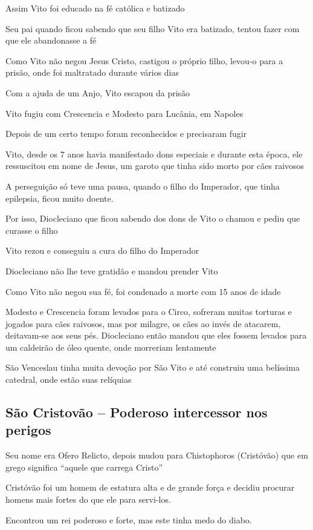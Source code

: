 \documentclass[a4paper,12pt]{extarticle} \usepackage[utf8]{inputenc}
\begin{document}
Assim Vito foi educado na fé católica e batizado

Seu pai quando ficou sabendo que seu filho Vito era batizado, tentou fazer com que ele abandonasse a fé

Como Vito não negou Jesus Cristo, castigou o próprio filho, levou-o para a prisão, onde foi maltratado durante vários dias

Com a ajuda de um Anjo, Vito escapou da prisão

Vito fugiu com Crescencia e Modesto para Lucânia, em Napoles

Depois de um certo tempo foram reconhecidos e precisaram fugir

Vito, desde os 7 anos havia manifestado dons especiais e durante esta época, ele ressuscitou em nome de Jesus, um garoto que tinha sido morto por cães raivosos

A perseguição só teve uma pausa, quando o filho do Imperador, que tinha epilepsia, ficou muito doente.

Por isso, Diocleciano que ficou sabendo dos dons de Vito o chamou e pediu que curasse o filho

Vito rezou e conseguiu a cura do filho do Imperador

Diocleciano não lhe teve gratidão e mandou prender Vito

Como Vito não negou sua fé, foi condenado a morte com 15 anos de idade

Modesto e Crescencia foram levados para o Circo, sofreram muitas torturas e jogados para cães raivosos, mas por milagre, os cães ao invés de atacarem, deitavam-se aos seus pés. Diocleciano então mandou que eles fossem levados para um caldeirão de óleo quente, onde morreriam lentamente

São Venceslau tinha muita devoção por São Vito e até construiu uma belíssima catedral, onde estão suas relíquias


\subsection{São Cristovão – Poderoso intercessor nos perigos}

Seu nome era Ofero Relicto, depois mudou para Chistophoros (Cristóvão) que em grego significa “aquele que carrega Cristo”

Cristóvão foi um homem de estatura alta e de grande força e decidiu procurar homens mais fortes do que ele para servi-los.

Encontrou um rei poderoso e forte, mas este tinha medo do diabo.
\end{document}
